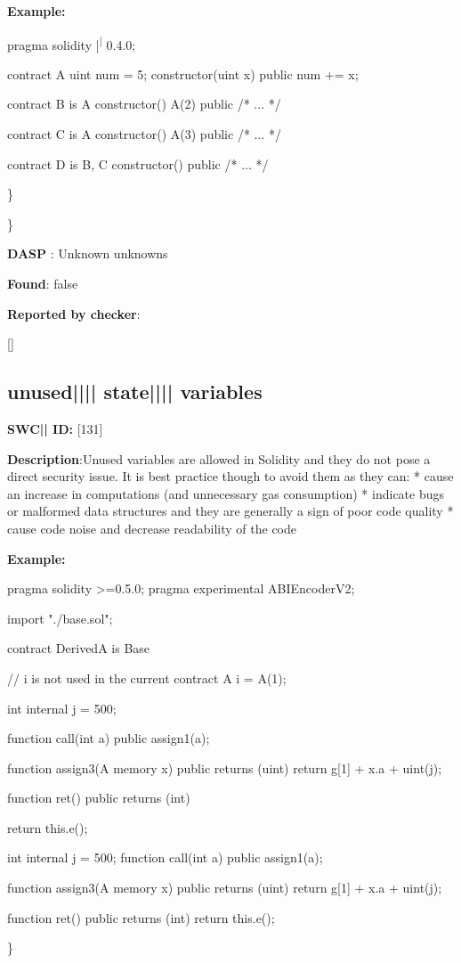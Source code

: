 \documentclass{article}
\begin{document}
\textbf{Example:} 
\begin{ffcode} 

pragma solidity |\textsuperscript| 0.4.0;

contract A{
    uint num = 5;
    constructor(uint x) public{
        num += x;
    }
}

contract B is A{
    constructor() A(2) public { /* ... */ }
}

contract C is A {
    constructor() A(3) public { /* ... */ }
}

contract D is B, C {
    constructor() public { /* ... */ }
}

\end{ffcode} 
\} 

\} 

\textbf{DASP} : Unknown unknowns

\textbf{Found}: false

\textbf{Reported by checker}: 
\begin{ffcode} 

[]
\end{ffcode} 
\subsection{unused{||\textunderscore|| }state{||\textunderscore|| }variables} 
\textbf{SWC{|\textunderscore| }ID:} [131]

\textbf{Description}:Unused variables are allowed in Solidity and they do not pose a direct security issue. It is best practice though to avoid them as they can:
* cause an increase in computations (and unnecessary gas consumption)
* indicate bugs or malformed data structures and they are generally a sign of poor code quality
* cause code noise and decrease readability of the code


\textbf{Example:} 
\begin{ffcode} 

pragma solidity >=0.5.0;
pragma experimental ABIEncoderV2;

import "./base.sol";

contract DerivedA is Base {
    // i is not used in the current contract
    A i = A(1);

    int internal j = 500;

    function call(int a) public {
        assign1(a);
    }

    function assign3(A memory x) public returns (uint) {
        return g[1] + x.a + uint(j);
    }

    function ret() public returns (int){
        return this.e();

    }
  int internal j = 500;
function call(int a) public {
        assign1(a);
    }

    function assign3(A memory x) public returns (uint) {
        return g[1] + x.a + uint(j);
    }

    function ret() public returns (int){
        return this.e();
  }
}

\end{ffcode} 
\} 
\end{document}
